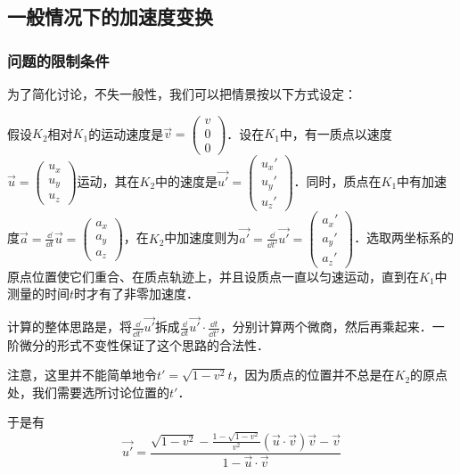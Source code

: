 

\subsection{一般情况下的加速度变换}
\subsubsection{问题的限制条件}

为了简化讨论，不失一般性，我们可以把情景按以下方式设定：

假设$K_2$相对$K_1$的运动速度是$\vec{v}=\left(\begin{matrix}v\\0\\0\end{matrix} \right) $．设在$K_1$中，有一质点以速度$\vec{u}=\left(\begin{matrix}u_x\\u_y\\u_z\end{matrix} \right) \tag{2}$运动，其在$K_2$中的速度是$\vec{u'}=\left(\begin{matrix}u_x'\\u_y'\\u_z'\end{matrix} \right) $．同时，质点在$K_1$中有加速度$\vec{a}=\frac{\dd}{\dd{t}}\vec{u}=\left(\begin{matrix}a_x\\a_y\\a_z\end{matrix} \right)$，在$K_2$中加速度则为$\vec{a'}=\frac{\dd}{\dd{t'}}\vec{u'}=\left(\begin{matrix}a_x'\\a_y'\\a_z'\end{matrix} \right)$．选取两坐标系的原点位置使它们重合、在质点轨迹上，并且设质点一直以匀速运动，直到在$K_1$中测量的时间$t$时才有了非零加速度．

计算的整体思路是，将$\frac{\dd}{\dd{t'}}\vec{u'}$拆成$\frac{\dd}{\dd{t}}\vec{u'}\cdot\frac{\dd{t}}{\dd{t'}}$，分别计算两个微商，然后再乘起来．一阶微分的形式不变性保证了这个思路的合法性．

注意，这里并不能简单地令$t'=\sqrt{1-v^2}t$，因为质点的位置并不总是在$K_2$的原点处，我们需要选所讨论位置的$t'$．

于是有
\begin{equation}\label{SRAcc_eq2}
\vec{u'}=\frac{\sqrt{1-v^2}-\frac{1-\sqrt{1-v^2}}{v^2}(\vec{u}\cdot\vec{v})\vec{v}-\vec{v}}{1-\vec{u}\cdot\vec{v}}
\end{equation}


